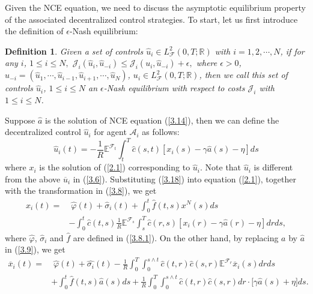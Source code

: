 \documentclass[11pt]{article}
\newtheorem{definition}{Definition}[section]
\def\dbE{\mathbb{E}}
\def\dbR{\mathbb{R}}
\begin{document}
Given the NCE equation, we need to discuss the asymptotic
equilibrium property of the associated decentralized control
strategies. To start, let us first introduce the definition of
$\epsilon$-Nash equilibrium:
\begin{definition}
Given a set of controls $\widehat{u}_i\in
L^2_{\mathcal{F}}(0,T;\dbR)$ with $i=1,2,\cdots,N$, if for any $i$,
$1\leq i\leq N,$ $\mathcal{J}_i(\widehat{u}_i,\widehat{u}_{-i})\leq
\mathcal{J}_i(u_i,\widehat{u}_{-i})+\epsilon, $ where $\epsilon>0$,
$\widehat{u}_{-i}=(\widehat{u}_1,\cdots,\widehat{u}_{i-1},\widehat{u}_{i+1},\cdots,\widehat{u}_{N})$,
$u_i\in L^2_{\mathcal{F}}(0,T;\dbR)$, then we call this set of
controls $\widehat{u}_i$, $1\leq i\leq N$ an $\epsilon$-Nash
equilibrium with respect to costs $\mathcal{J}_i$ with $1\leq i\leq
N$.
\end{definition}
Suppose $\widehat{a}$ is the solution of NCE equation (\ref{3.14}), then we can
define the decentralized control $\widehat{u}_i$ for agent $\mathcal{A}_i$ as
follows:
%
\begin{equation}\label{3.18}
\widehat{u}_{i}(t)=-\frac{1}{R}\dbE^{\mathcal{F}_{t}}\!\!\int_{t}^{T}\widehat{c}%
(s,t)[x_{i}(s)-\gamma \widehat{a}(s)-\eta]ds
\end{equation}%
%
where $x_i$ is the solution of (\ref{2.1}) corresponding to
$\widehat{u}_i$. Note that $\widehat{u}_i$ is different from
the above $\overline{u}_i$ in (\ref{3.6}). Substituting (\ref{3.18})
into equation (\ref{2.1}), together with the transformation in
(\ref{3.8}), we get
%
\begin{align}\label{3.19}
x_{i}(t)=& \; \widehat{\varphi }(t)+\widehat{\sigma }_i%
(t)+\int_0^t\widehat{f}(t,s)x^{N}(s)ds\nonumber\\
&- \int_{0}^{t}\widehat{c}(t,s)\frac{1}{R}\dbE^{\mathcal{F}_{s}}\!\!\int_{s}^{T}\widehat{c}%
(r,s)[x_{i}(r)-\gamma \widehat{a}(r)-\eta]drds,
\end{align}%
%
where $\widehat{\varphi}$, $\widehat{\sigma}_i$ and $\widehat{f}$
are defined in (\ref{3.8.1}). On the other hand, by replacing $a$ by
$\widehat{a}$ in (\ref{3.9}), we get
%
\begin{align}\label{3.20}
\overline{x}_{i}(t) = & \; \widehat{\varphi }(t)+\widehat{\sigma_i}
(t)-\frac{1}{R}\int_{0}^{T}\int_{0}^{s\wedge t}\widehat{c}(t,r)\widehat{c}
(s,r)\dbE^{\mathcal{F}_{r}}\overline{x}_{i}(s)drds  \nonumber \\
& +\int_0^t\widehat{f}(t,s)\widehat{a}(s)ds+\frac{1}{R}\int_{0}^{T}\int_{0}^{s\wedge t}
\widehat{c}(t,r)\widehat{c}(s,r)dr\cdot \lbrack \gamma \widehat{a}(s)+\eta ]ds.
\end{align}
\end{document}
